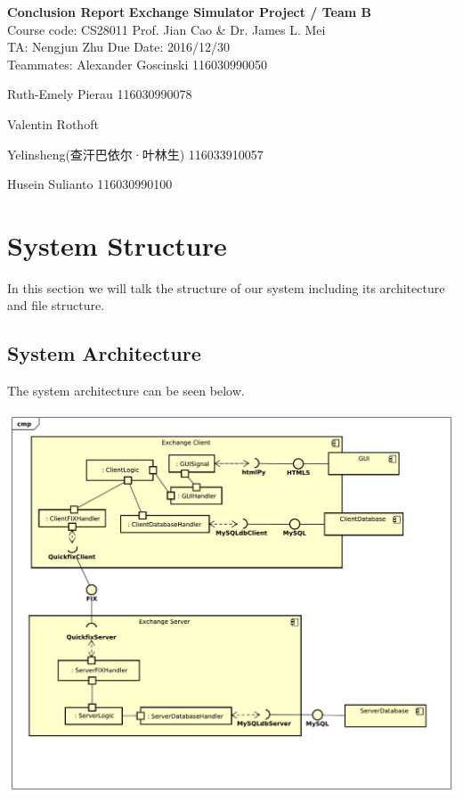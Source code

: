 \documentclass[a4paper, 11pt]{article}
\begin{document}
\noindent

\large\textbf{Conclusion Report}
\hfill \textbf{Exchange Simulator Project / Team B} \\

\normalsize Course code: CS28011 \hfill Prof. Jian Cao \& Dr. James L. Mei\\

TA: Nengjun Zhu  \hfill Due Date: 2016/12/30 \\

Teammates:
Alexander Goscinski 116030990050

Ruth-Emely Pierau 116030990078

Valentin Rothoft

Yelinsheng(查汗巴依尔·叶林生) 116033910057

Husein Sulianto 116030990100



\section*{System Structure}
In this section we will talk the structure of our system including its architecture and file structure.

\subsection*{System Architecture}
The system architecture can be seen below.

\begin{center}\includegraphics[scale=0.4]{../diagrams/Component_Diagram_final.pdf}\end{center}
\end{document}
